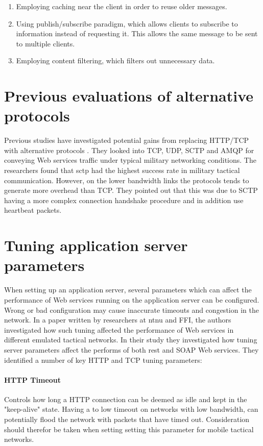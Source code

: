 \begin{enumerate}
    \item Employing caching near the client in order to reuse older messages.
    \item Using publish/subscribe paradigm, which allows clients to subscribe to
    information instead of requesting it. This allows the same message to be sent
    to multiple clients.
    \item Employing content filtering, which filters out unnecessary data.
\end{enumerate}

\section{Previous evaluations of alternative protocols}

Previous studies have investigated potential gains from replacing HTTP/TCP with
alternative protocols \cite{evaluation-transport-protocols-web-services}. They
looked into TCP, UDP, SCTP and AMQP for conveying Web services traffic under
typical military networking conditions. The researchers found that \gls{sctp}
had the highest success rate in military tactical communication. However, on the
lower bandwidth links the protocols tends to generate more overhead than TCP.
They pointed out that this was due to SCTP having a more complex connection
handshake procedure and in addition use heartbeat packets.

\section{Tuning application server parameters}

When setting up an application server, several parameters which can affect the
performance of Web services running on the application server can be configured.
Wrong or bad configuration may cause inaccurate timeouts and congestion in the
network. In a paper written by researchers at \gls{ntnu} and FFI, the authors
investigated how such tuning affected the performance of Web services in
different emulated tactical
networks\cite{johnsen-bloebaum-recommendations-web-services-tactical-domain}. In
their study they investigated how tuning server parameters affect the performs
of both \gls{rest} and SOAP Web services. They identified a number of key HTTP
and TCP tuning parameters:

\paragraph{HTTP Timeout} Controls how long a HTTP connection can be deemed as
idle and kept in the "keep-alive" state. Having a to low timeout on networks
with low bandwidth, can potentially flood the network with packets that have
timed out. Consideration should therefor be taken when setting setting this
parameter for mobile tactical networks.

